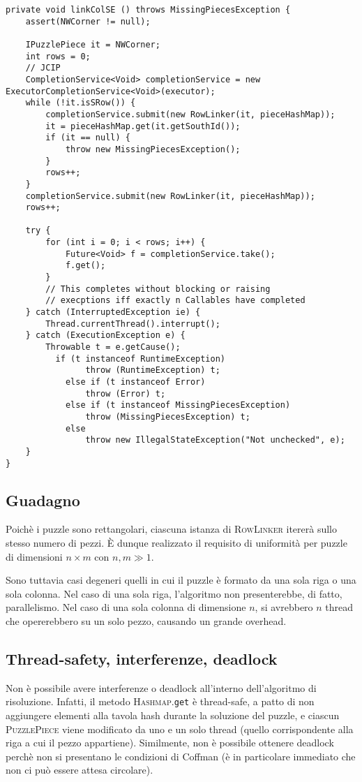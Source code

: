 \documentclass[a4paper]{article}
\newcommand{\Classname}[1]{\textsc{#1}}
\newcommand{\Methodname}[1]{\texttt{#1}}
\begin{document}
\begin{verbatim}
private void linkColSE () throws MissingPiecesException {
	assert(NWCorner != null);
	
	IPuzzlePiece it = NWCorner;
	int rows = 0;
	// JCIP
	CompletionService<Void> completionService = new ExecutorCompletionService<Void>(executor);
	while (!it.isSRow()) {
		completionService.submit(new RowLinker(it, pieceHashMap));
		it = pieceHashMap.get(it.getSouthId());
		if (it == null) {
			throw new MissingPiecesException();
		}
		rows++;
	}
	completionService.submit(new RowLinker(it, pieceHashMap));
	rows++;

	try {
		for (int i = 0; i < rows; i++) {
			Future<Void> f = completionService.take();
			f.get();
		}
		// This completes without blocking or raising
		// execptions iff exactly n Callables have completed
	} catch (InterruptedException ie) {
		Thread.currentThread().interrupt();
	} catch (ExecutionException e) {
		Throwable t = e.getCause();
		  if (t instanceof RuntimeException) 
	            throw (RuntimeException) t;
	        else if (t instanceof Error)
	            throw (Error) t;
	        else if (t instanceof MissingPiecesException)
	        	throw (MissingPiecesException) t;
	        else
	            throw new IllegalStateException("Not unchecked", e);
	}
}

\end{verbatim}

\subsection{Guadagno}
Poich\`e i puzzle sono rettangolari, ciascuna istanza di \Classname{RowLinker} iterer\`a sullo stesso numero di pezzi.
\`E dunque realizzato il requisito di uniformit\`a per puzzle di dimensioni $n \times m$ con $n, m \gg 1$.

Sono tuttavia casi degeneri quelli in cui il puzzle \`e formato da una sola riga o una sola colonna.
Nel caso di una sola riga, l'algoritmo non presenterebbe, di fatto, parallelismo.
Nel caso di una sola colonna di dimensione $n$, si avrebbero $n$ thread che opererebbero su un solo pezzo, causando un grande overhead.

\subsection{Thread-safety, interferenze, deadlock}
Non \`e possibile avere interferenze o deadlock all'interno dell'algoritmo di risoluzione.
Infatti, il metodo \Classname{Hashmap}.\Methodname{get} \`e thread-safe, a patto di non aggiungere elementi alla tavola hash durante la soluzione del puzzle, e ciascun \Classname{PuzzlePiece} viene modificato da uno e un solo thread (quello corrispondente alla riga a cui il pezzo appartiene).
Similmente, non \`e possibile ottenere deadlock perch\`e non si presentano le condizioni di Coffman (\`e in particolare immediato che non ci pu\`o essere attesa circolare).
\end{document}
